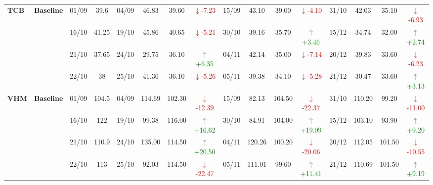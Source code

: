 \documentclass{ieeeaccess}
\begin{document}
{\begin{longtable}{llcc|cccc|cccc|cccc}
\multirow{4}{*}{\textbf{TCB}}
& \textbf{Baseline}
& 01/09 & 39.6 & 04/09 & 46.83 & 39.60 & \textcolor{red}{\(\downarrow\)-7.23} & 15/09 & 43.10 & 39.00 & \textcolor{red}{\(\downarrow\)-4.10} & 31/10 & 42.03 & 35.10 & \textcolor{red}{\(\downarrow\)-6.93} \\
& & 16/10 & 41.25 & 19/10 & 45.86 & 40.65 & \textcolor{red}{\(\downarrow\)-5.21} & 30/10 & 39.16 & 35.70 & \textcolor{green}{\(\uparrow\)+3.46} & 15/12 & 34.74 & 32.00 & \textcolor{green}{\(\uparrow\)+2.74} \\
& & 21/10 & 37.65 & 24/10 & 29.75 & 36.10 & \textcolor{green}{\(\uparrow\)+6.35} & 04/11 & 42.14 & 35.00 & \textcolor{red}{\(\downarrow\)-7.14} & 20/12 & 39.83 & 33.60 & \textcolor{red}{\(\downarrow\)-6.23} \\
& & 22/10 & 38 & 25/10 & 41.36 & 36.10 & \textcolor{red}{\(\downarrow\)-5.26} & 05/11 & 39.38 & 34.10 & \textcolor{red}{\(\downarrow\)-5.28} & 21/12 & 30.47 & 33.60 & \textcolor{green}{\(\uparrow\)+3.13} \\
\midrule

\multirow{4}{*}{\textbf{VHM}}
& \textbf{Baseline}
& 01/09 & 104.5 & 04/09 & 114.69 & 102.30 & \textcolor{red}{\(\downarrow\)-12.39} & 15/09 & 82.13 & 104.50 & \textcolor{red}{\(\downarrow\)-22.37} & 31/10 & 110.20 & 99.20 & \textcolor{red}{\(\downarrow\)-11.00} \\
& & 16/10 & 122 & 19/10 & 99.38 & 116.00 & \textcolor{green}{\(\uparrow\)+16.62} & 30/10 & 84.91 & 104.00 & \textcolor{green}{\(\uparrow\)+19.09} & 15/12 & 103.10 & 93.90 & \textcolor{green}{\(\uparrow\)+9.20} \\
& & 21/10 & 110.9 & 24/10 & 135.00 & 114.50 & \textcolor{green}{\(\uparrow\)+20.50} & 04/11 & 120.26 & 100.20 & \textcolor{red}{\(\downarrow\)-20.06} & 20/12 & 112.05 & 101.50 & \textcolor{red}{\(\downarrow\)-10.55} \\
& & 22/10 & 113 & 25/10 & 92.03 & 114.50 & \textcolor{red}{\(\downarrow\)-22.47} & 05/11 & 111.01 & 99.60 & \textcolor{green}{\(\uparrow\)+11.41} & 21/12 & 110.69 & 101.50 & \textcolor{green}{\(\uparrow\)+9.19} \\
\midrule


\end{longtable}}
\end{document}
